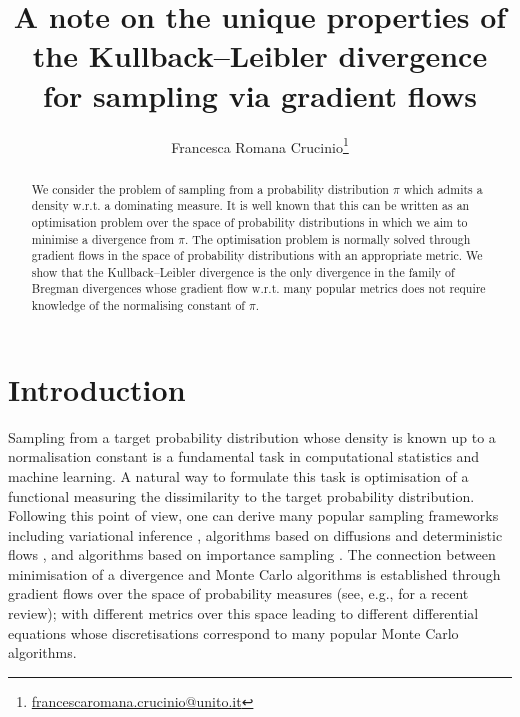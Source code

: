 \documentclass{article}
\title{A note on the unique properties of the Kullback--Leibler divergence for sampling via gradient flows}
\author[1]{Francesca Romana Crucinio\thanks{ \href{mailto:francescaromana.crucinio@unito.it}{francescaromana.crucinio@unito.it}}}
\affil[1]{ESOMAS, University of Turin, Italy \& Collegio Carlo Alberto, Turin, Italy}
\date{ }
\begin{document}
\maketitle

\begin{abstract}

We consider the problem of sampling from a probability distribution $\pi$ which admits a density w.r.t. a dominating measure. It is well known that this can be written as an optimisation problem over the space of probability distributions in which we aim to minimise a divergence from $\pi$. The optimisation problem is normally solved through gradient flows in the space of probability distributions with an appropriate metric. We show that the Kullback--Leibler divergence is the only divergence in the family of Bregman divergences whose gradient flow w.r.t. many popular metrics does not require knowledge of the normalising constant of $\pi$.
\end{abstract}


\section{Introduction}
Sampling from a target probability distribution whose density is known up to a normalisation constant is a fundamental task in computational statistics and machine learning. A natural way to formulate this task is optimisation of a functional measuring the dissimilarity to the target probability distribution.
Following this point of view, one can derive many popular sampling frameworks including variational inference \citep{blei2017variational}, algorithms based on diffusions \citep{roberts1996exponential, durmus2019analysis} and deterministic flows \citep{liu2017stein}, and algorithms based on importance sampling \citep{chopin2023connection, crucinio2025}.
The connection between minimisation of a divergence and Monte Carlo algorithms is established through gradient flows over the space of probability measures (see, e.g., \cite{chewi2025statistical, carrillo_fisher-rao_2024} for a recent review); with different metrics over this space leading to different differential equations whose discretisations correspond to many popular Monte Carlo algorithms.
\end{document}

